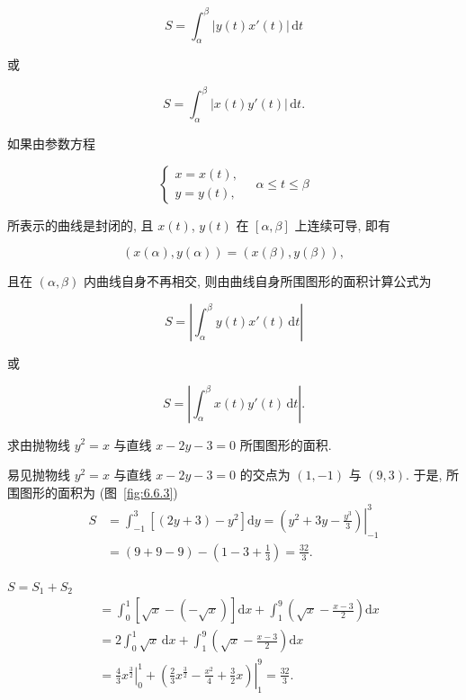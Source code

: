 \[
S=\int_{\alpha}^{\beta}|y(t)x'(t)|\,\mathrm{d}t
\]

或

\[
S=\int_{\alpha}^{\beta}|x(t)y'(t)|\,\mathrm{d}t.
\]

如果由参数方程

\[
\begin{cases}
x=x(t),\\
y=y(t),
\end{cases}\quad\alpha\leqslant t\leqslant\beta
\]

所表示的曲线是封闭的, 且 $x(t)$, $y(t)$ 在 $[\alpha,\beta]$ 上连续可导, 即有

\[
(x(\alpha),y(\alpha))=(x(\beta),y(\beta)),
\]

且在 $(\alpha,\beta)$ 内曲线自身不再相交, 则由曲线自身所围图形的面积计算公式为

\[
S=\left|\int_{\alpha}^{\beta}y(t)x'(t)\,\mathrm{d}t\right|
\]

或

\[
S=\left|\int_{\alpha}^{\beta}x(t)y'(t)\,\mathrm{d}t\right|.
\]

\begin{example}\label{ex:6.6.1}
求由抛物线 $y^{2}=x$ 与直线 $x-2y-3=0$ 所围图形的面积.
\end{example}

\begin{solution}[解法 1]
易见抛物线 $y^{2}=x$ 与直线 $x-2y-3=0$ 的交点为 $(1,-1)$ 与 $(9,3)$. 于是, 所围图形的面积为 (图~\ref{fig:6.6.3})
\[
\begin{aligned}
S&=\int_{-1}^{3}\left[(2y+3)-y^{2}\right]\mathrm{d}y=\left.\left(y^{2}+3y-\frac{y^{3}}{3}\right)\right|_{-1}^{3}\\
&=(9+9-9)-\left(1-3+\frac{1}{3}\right)=\frac{32}{3}.
\end{aligned}
\]
\end{solution}

\begin{solution}[解法 2]
$S=S_{1}+S_{2}$
\[
\begin{aligned}
&=\int_{0}^{1}\left[\sqrt{x}-(-\sqrt{x})\right]\mathrm{d}x+\int_{1}^{9}\left(\sqrt{x}-\frac{x-3}{2}\right)\mathrm{d}x\\
&=2\int_{0}^{1}\sqrt{x}\,\mathrm{d}x+\int_{1}^{9}\left(\sqrt{x}-\frac{x-3}{2}\right)\mathrm{d}x\\
&=\left.\frac{4}{3}x^{\frac{3}{2}}\right|_{0}^{1}+\left.\left(\frac{2}{3}x^{\frac{3}{2}}-\frac{x^{2}}{4}+\frac{3}{2}x\right)\right|_{1}^{9}=\frac{32}{3}.
\end{aligned}
\]
\end{solution}

